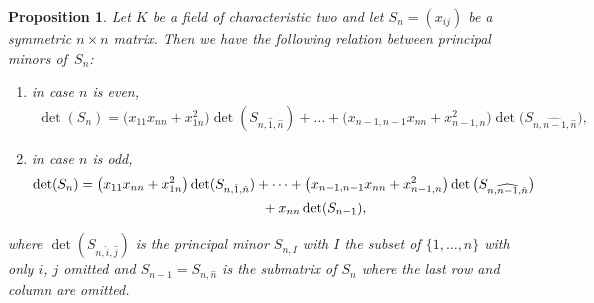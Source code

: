 \documentclass[pdftex]{sigma}
\numberwithin{equation}{section}
\newtheorem{Proposition}[Theorem]{Proposition}
{ \theoremstyle{definition}
\newtheorem{Definition}[Theorem]{Definition}
\newtheorem{Example}[Theorem]{Example}
\newtheorem{Examples}[Theorem]{Examples}
\newtheorem{Remark}[Theorem]{Remark} }
\begin{document}
\begin{Proposition}\label{prop} Let $K$ be a field of characteristic two and let $S_n=(x_{ij})$ be a symmetric $n\times n$ matrix. Then we have the following relation between
principal minors of~$S_n$:
\begin{enumerate}\itemsep=0pt
 \item[$(1)$] in case $n$ is even, %
\begin{gather*}
\det(S_n) = \big(x_{11}x_{nn}+x_{1n}^2\big)\det(S_{n,\hat{1},\hat{n}})+\dots+\big(x_{n-1,n-1}x_{nn}+x_{n-1,n}^2\big)\det\big(S_{n,\widehat{n-1},\hat{n}}\big),
\end{gather*}
\item[$(2)$] in case $n$ is odd, %
\begin{gather*}
\det(S_n) = \big(x_{11}x_{nn}+x_{1n}^2\big)\det(S_{n,\hat{1},\hat{n}})+\dots +\big(x_{n-1,n-1}x_{nn}+x_{n-1,n}^2\big)\det\big(S_{n,\widehat{n-1},\hat{n}}\big)\\
\hphantom{\det(S_n) =}{} + x_{nn}\det(S_{n-1}),
\end{gather*}
\end{enumerate}
where $\det(S_{n,\hat{i},\hat{j}})$ is the principal minor $S_{n,I}$ with $I$ the subset of $\{1,\ldots,n\}$ with only $i$, $j$ omitted and $S_{n-1}=S_{n,\hat{n}}$ is the submatrix of $S_n$ where the last row and column are omitted.
\end{Proposition}
\end{document}
